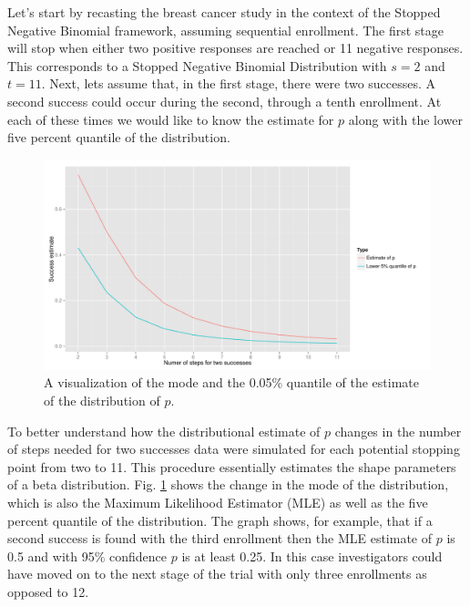 \documentclass[12pt]{article}         %
\begin{document}
Let's start by recasting the breast cancer study in the context of the Stopped Negative Binomial framework, assuming sequential enrollment. The first stage will stop when either two positive responses are reached or 11 negative responses. This corresponds to a Stopped Negative Binomial Distribution with $s=2$ and $t=11$. Next, lets assume that, in the first stage, there were two successes. A second success could occur during the second, through a tenth enrollment. At each of these times we would like to know the estimate for $p$ along with the lower five percent quantile of the distribution.

\begin{figure}[ht]
\includegraphics[width=\textwidth]{uncertainty.pdf}
\caption{
A visualization of the mode and the 0.05\% quantile of the estimate of the distribution of $p$.
}
\label{fig:simon}
\end{figure}

To better understand how the distributional estimate of $p$ changes in the number of steps needed for two successes data were simulated for each potential stopping point from two to 11. This procedure essentially estimates the shape parameters of a beta distribution. Fig. \ref{fig:simon} shows the change in the mode of the distribution, which is also the Maximum Likelihood Estimator (MLE) as well as the five percent quantile of the distribution. The graph shows, for example, that if a second success is found with the third enrollment then the MLE estimate of $p$ is 0.5 and with 95\% confidence $p$ is at least 0.25. In this case investigators could have moved on to the next stage of the trial with only three enrollments as opposed to 12.
\end{document}
